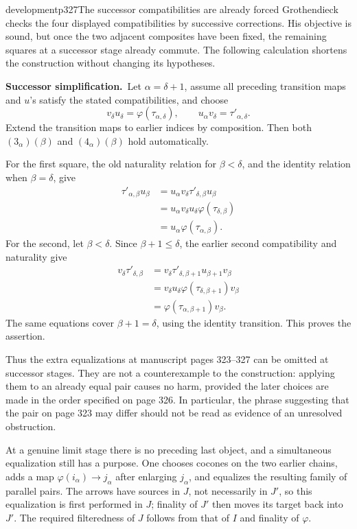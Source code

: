 \begin{dcomment}{development}{p327}{The successor compatibilities are already forced}
Grothendieck checks the four displayed compatibilities by successive corrections. His objective is sound, but once the two adjacent composites have been fixed, the remaining squares at a successor stage already commute. The following calculation shortens the construction without changing its hypotheses.

\textbf{Successor simplification.}\ours\ Let $\alpha=\delta+1$, assume all preceding transition maps and $u$'s satisfy the stated compatibilities, and choose
\[
 v_\delta u_\delta=\varphi(\tau_{\alpha,\delta}),
 \qquad
 u_\alpha v_\delta=\tau'_{\alpha,\delta}.
\]
Extend the transition maps to earlier indices by composition. Then both $(3_\alpha)(\beta)$ and $(4_\alpha)(\beta)$ hold automatically.

For the first square, the old naturality relation for $\beta<\delta$, and the identity relation when $\beta=\delta$, give
\[
\begin{aligned}
\tau'_{\alpha,\beta}u_\beta
 &=u_\alpha v_\delta\tau'_{\delta,\beta}u_\beta\\
 &=u_\alpha v_\delta u_\delta\varphi(\tau_{\delta,\beta})\\
 &=u_\alpha\varphi(\tau_{\alpha,\beta}).
\end{aligned}
\]
For the second, let $\beta<\delta$. Since $\beta+1\leq\delta$, the earlier second compatibility and naturality give
\[
\begin{aligned}
v_\delta\tau'_{\delta,\beta}
 &=v_\delta\tau'_{\delta,\beta+1}
                         u_{\beta+1}v_\beta\\
 &=v_\delta u_\delta\varphi(\tau_{\delta,\beta+1})v_\beta\\
 &=\varphi(\tau_{\alpha,\beta+1})v_\beta .
\end{aligned}
\]
The same equations cover $\beta+1=\delta$, using the identity transition. This proves the assertion.

Thus the extra equalizations at manuscript pages 323--327 can be omitted at successor stages. They are not a counterexample to the construction: applying them to an already equal pair causes no harm, provided the later choices are made in the order specified on page 326. In particular, the phrase suggesting that the pair on page 323 may differ should not be read as evidence of an unresolved obstruction.

At a genuine limit stage there is no preceding last object, and a simultaneous equalization still has a purpose. One chooses cocones on the two earlier chains, adds a map $\varphi(i_\alpha)\to j_\alpha$ after enlarging $j_\alpha$, and equalizes the resulting family of parallel pairs. The arrows have sources in $J$, not necessarily in $J'$, so this equalization is first performed in $J$; finality of $J'$ then moves its target back into $J'$. The required filteredness of $J$ follows from that of $I$ and finality of $\varphi$.


\end{dcomment}
